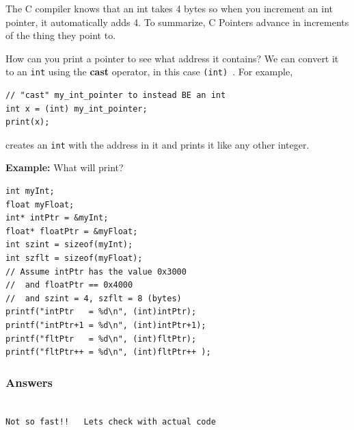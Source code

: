 The C compiler knows that an int takes 4 bytes so when you increment an int pointer, it automatically adds 4. 
To summarize,
C Pointers advance in increments of the thing they
point to.


%

How can you print a pointer to see what address it contains?   We can convert it to an {\tt int} using the 	%
{\bf cast} operator, in this case {\tt (int) }.  For example, 


\begin{verbatim}
// "cast" my_int_pointer to instead BE an int
int x = (int) my_int_pointer;
print(x);
\end{verbatim}

creates an {\tt int} with the address in it and prints it like any other integer.




\noindent
{\bf Example:}    What will print?

\begin{verbatim}
int myInt;
float myFloat;
int* intPtr = &myInt;
float* floatPtr = &myFloat;
int szint = sizeof(myInt);
int szflt = sizeof(myFloat);
// Assume intPtr has the value 0x3000
//  and floatPtr == 0x4000
//  and szint = 4, szflt = 8 (bytes)
printf("intPtr   = %d\n", (int)intPtr);
printf("intPtr+1 = %d\n", (int)intPtr+1);
printf("fltPtr   = %d\n", (int)fltPtr);
printf("fltPtr++ = %d\n", (int)fltPtr++ );
\end{verbatim}






\subsubsection*{Answers}	%
\begin{verbatim}

Not so fast!!   Lets check with actual code

\end{verbatim}


